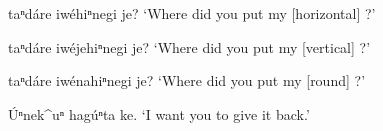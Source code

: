 \documentclass[output=paper]{LSP/langsci}
\begin{document}
\begin{list}{}{}
\item{\underline{\hspace{1em}} taⁿdáre iwéhiⁿnegi  je? `Where did you put my [horizontal] \underline{\hspace{1em}}?'}
\item{\underline{\hspace{1em}} taⁿdáre iwéjehiⁿnegi je? `Where did you put my [vertical] \underline{\hspace{1em}}?'}
\item{\underline{\hspace{1em}} taⁿdáre iwénahiⁿnegi je? `Where did you put my [round] \underline{\hspace{1em}}?'}
\item{\'Uⁿnek\^{ }uⁿ hagúⁿta ke. `I want you to give it back.'}
\end{list} 
 
\end{document}
